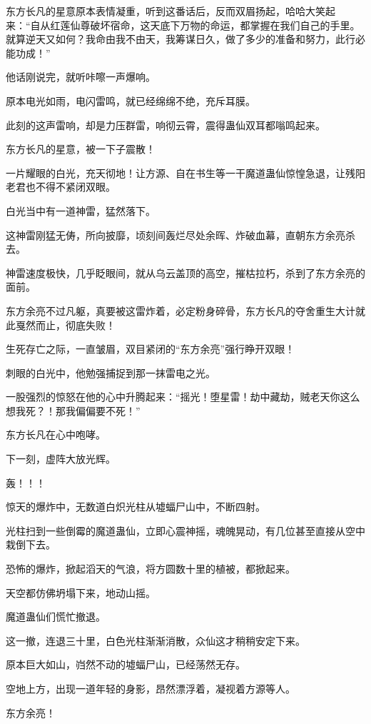 \begin{this_body}
东方长凡的星意原本表情凝重，听到这番话后，反而双眉扬起，哈哈大笑起来：“自从红莲仙尊破坏宿命，这天底下万物的命运，都掌握在我们自己的手里。就算逆天又如何？我命由我不由天，我筹谋日久，做了多少的准备和努力，此行必能功成！”

他话刚说完，就听咔嚓一声爆响。

原本电光如雨，电闪雷鸣，就已经绵绵不绝，充斥耳膜。

此刻的这声雷响，却是力压群雷，响彻云霄，震得蛊仙双耳都嗡鸣起来。

东方长凡的星意，被一下子震散！

一片耀眼的白光，充天彻地！让方源、自在书生等一干魔道蛊仙惊惶急退，让残阳老君也不得不紧闭双眼。

白光当中有一道神雷，猛然落下。

这神雷刚猛无俦，所向披靡，顷刻间轰烂尽处余晖、炸破血幕，直朝东方余亮杀去。

神雷速度极快，几乎眨眼间，就从乌云盖顶的高空，摧枯拉朽，杀到了东方余亮的面前。

东方余亮不过凡躯，真要被这雷炸着，必定粉身碎骨，东方长凡的夺舍重生大计就此戛然而止，彻底失败！

生死存亡之际，一直皱眉，双目紧闭的“东方余亮”强行睁开双眼！

刺眼的白光中，他勉强捕捉到那一抹雷电之光。

一股强烈的惊怒在他的心中升腾起来：“摇光！堕星雷！劫中藏劫，贼老天你这么想我死？！那我偏偏要不死！”

东方长凡在心中咆哮。

下一刻，虚阵大放光辉。

轰！！！

惊天的爆炸中，无数道白炽光柱从墟蝠尸山中，不断四射。

光柱扫到一些倒霉的魔道蛊仙，立即心震神摇，魂魄晃动，有几位甚至直接从空中栽倒下去。

恐怖的爆炸，掀起滔天的气浪，将方圆数十里的植被，都掀起来。

天空都仿佛坍塌下来，地动山摇。

魔道蛊仙们慌忙撤退。

这一撤，连退三十里，白色光柱渐渐消散，众仙这才稍稍安定下来。

原本巨大如山，岿然不动的墟蝠尸山，已经荡然无存。

空地上方，出现一道年轻的身影，昂然漂浮着，凝视着方源等人。

东方余亮！

\end{this_body}

